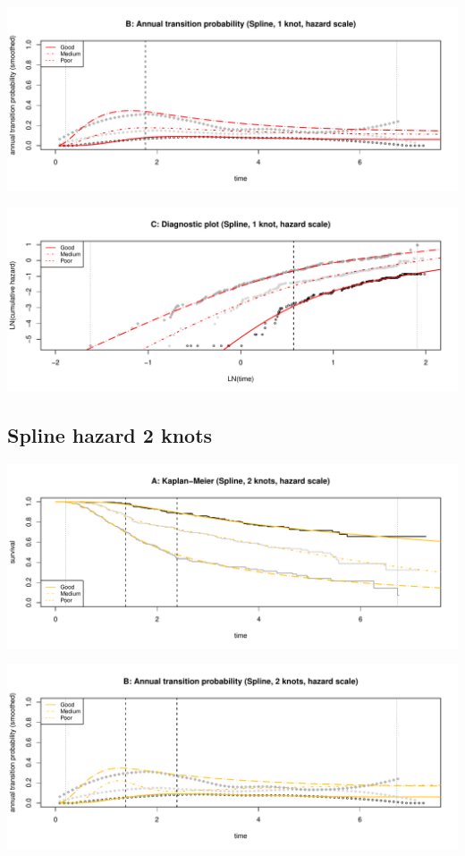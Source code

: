 \documentclass[]{article}
\begin{document}
\begin{flushleft}\includegraphics[height=0.3\textheight]{images/spline_hazard1-2} \end{flushleft}

\begin{flushleft}\includegraphics[height=0.3\textheight]{images/spline_hazard1-3} \end{flushleft}

\subsection{Spline hazard 2 knots}\label{spline-hazard-2-knots}

\begin{flushleft}\includegraphics[height=0.3\textheight]{images/spline_hazard2-1} \end{flushleft}

\begin{flushleft}\includegraphics[height=0.3\textheight]{images/spline_hazard2-2} \end{flushleft}
\end{document}
